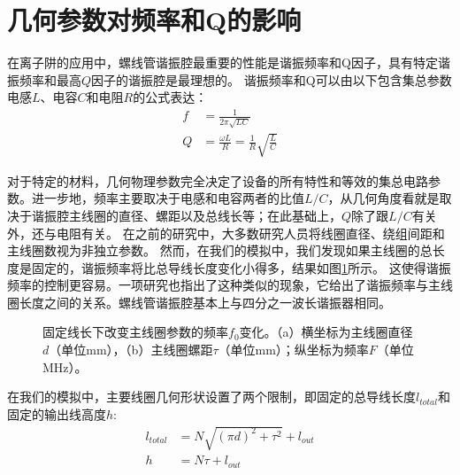 \section[几何参数对频率和Q的影响]{几何参数对频率和Q的影响}

在离子阱的应用中，螺线管谐振腔最重要的性能是谐振频率和Q因子，具有特定谐振频率和最高$Q$因子的谐振腔是最理想的\cite[]{Siverns_Simkins_Weidt_Hensinger_2012}。
谐振频率和Q可以由以下包含集总参数电感$L$、电容$C$和电阻$R$的公式表达：
\begin{align}
    f&=\frac{1}{2\pi\sqrt{LC}} \label{eq:helical_f_equation}\\
	Q&=\frac{\omega L}{R}=\frac{1}{R}\sqrt{\frac{L}{C}} \label{eq:helical_Q_equation}
\end{align}

对于特定的材料，几何物理参数完全决定了设备的所有特性和等效的集总电路参数。进一步地，频率主要取决于电感和电容两者的比值$L/C$，从几何角度看就是取决于谐振腔主线圈的直径、螺距以及总线长等；在此基础上，$Q$除了跟$L/C$有关外，还与电阻有关。
在之前的研究中，大多数研究人员将线圈直径、绕组间距和主线圈数视为非独立参数\cite[]{Siverns_Simkins_Weidt_Hensinger_2012,Macalpine_Schildknecht_1959}。
然而，在我们的模拟中，我们发现如果主线圈的总长度是固定的，谐振频率将比总导线长度变化小得多，结果如图\ref{fig:helical_fixedwirelength}所示。
这使得谐振频率的控制更容易。一项研究\cite[]{Nandi_Sikdar_Das_Ray_2022}也指出了这种类似的现象，它给出了谐振频率与主线圈长度之间的关系。螺线管谐振腔基本上与四分之一波长谐振器相同。
\begin{figure}
    \centering
    \caption[固定线长下改变主线圈参数的频率$f_0$变化]{固定线长下改变主线圈参数的频率$f_0$变化。（a）横坐标为主线圈直径$d$（单位mm），（b）主线圈螺距$\tau$（单位mm）；纵坐标为频率$F$（单位MHz）。\label{fig:helical_fixedwirelength}}
\end{figure}

在我们的模拟中，主要线圈几何形状设置了两个限制，即固定的总导线长度$l_{total}$和固定的输出线高度$h$:
\begin{align}
    l_{total}&=N\sqrt{(\pi d)^2+\tau^2}+l_{out} \label{eq:helical_fixed_constraints_1}\\
	h&=N\tau+l_{out} \label{eq:helical_fixed_constraints_2}
\end{align}

